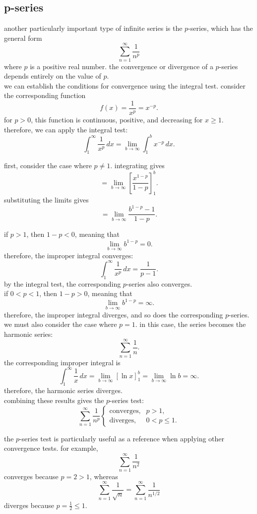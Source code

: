 \documentclass{article}
\begin{document}
\subsection{p-series}

another particularly important type of infinite series is the $p$-series, which has the general form
\[
\boxed{
\sum_{n=1}^{\infty}\frac{1}{n^p}
}
\]
where $p$ is a positive real number. the convergence or divergence of a $p$-series depends entirely on the value of $p$.\\

we can establish the conditions for convergence using the integral test. consider the corresponding function
\[
f(x)=\frac{1}{x^p}=x^{-p}.
\]
for $p>0$, this function is continuous, positive, and decreasing for $x\geq1$. therefore, we can apply the integral test:
\[
\int_1^\infty\frac{1}{x^p}\,dx
=
\lim_{b\to\infty}\int_1^b x^{-p}\,dx.
\]

first, consider the case where $p\neq1$. integrating gives
\[
=
\lim_{b\to\infty}
\left[\frac{x^{1-p}}{1-p}\right]_1^b.
\]
substituting the limits gives
\[
=
\lim_{b\to\infty}
\frac{b^{1-p}-1}{1-p}.
\]

if $p>1$, then $1-p<0$, meaning that
\[
\lim_{b\to\infty}b^{1-p}=0.
\]
therefore, the improper integral converges:
\[
\int_1^\infty\frac{1}{x^p}\,dx
=
\frac{1}{p-1}.
\]
by the integral test, the corresponding $p$-series also converges.\\

if $0<p<1$, then $1-p>0$, meaning that
\[
\lim_{b\to\infty}b^{1-p}=\infty.
\]
therefore, the improper integral diverges, and so does the corresponding $p$-series.\\

we must also consider the case where $p=1$. in this case, the series becomes the harmonic series:
\[
\sum_{n=1}^{\infty}\frac{1}{n}.
\]
the corresponding improper integral is
\[
\int_1^\infty\frac{1}{x}\,dx
=
\lim_{b\to\infty}[\ln x]_1^b
=
\lim_{b\to\infty}\ln b
=
\infty.
\]
therefore, the harmonic series diverges.\\

combining these results gives the $p$-series test:
\[
\boxed{
\sum_{n=1}^{\infty}\frac{1}{n^p}
\begin{cases}
\text{converges}, & p>1,\\
\text{diverges}, & 0<p\leq1.
\end{cases}
}
\]

the $p$-series test is particularly useful as a reference when applying other convergence tests. for example,
\[
\sum_{n=1}^{\infty}\frac{1}{n^2}
\]
converges because $p=2>1$, whereas
\[
\sum_{n=1}^{\infty}\frac{1}{\sqrt{n}}
=
\sum_{n=1}^{\infty}\frac{1}{n^{1/2}}
\]
diverges because $p=\frac12\leq1$.\\
\end{document}
